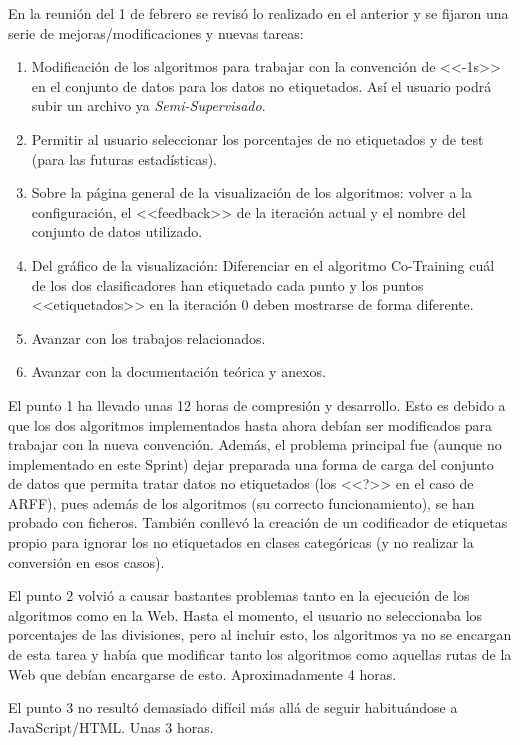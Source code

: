 En la reunión del 1 de febrero se revisó lo realizado en el anterior y se fijaron
una serie de mejoras/modificaciones y nuevas tareas:
\begin{enumerate}
    \item Modificación de los algoritmos para trabajar con la convención de
    <<-1s>> en el conjunto de datos para los datos no etiquetados. Así el
    usuario podrá subir un archivo ya \textit{Semi-Supervisado}.
    \item Permitir al usuario seleccionar los porcentajes de no etiquetados y de
    test (para las futuras estadísticas).
    \item Sobre la página general de la visualización de los algoritmos: volver
    a la configuración, el <<feedback>> de la iteración actual y el nombre del
    conjunto de datos utilizado.
    \item Del gráfico de la visualización: Diferenciar en el algoritmo
    Co-Training cuál de los dos clasificadores han etiquetado cada punto y los
    puntos <<etiquetados>> en la iteración 0 deben mostrarse de forma diferente.
    \item Avanzar con los trabajos relacionados.
    \item Avanzar con la documentación teórica y anexos.
\end{enumerate}

El punto 1 ha llevado unas 12 horas de compresión y desarrollo. Esto es debido a
que los dos algoritmos implementados hasta ahora debían ser modificados para
trabajar con la nueva convención. Además, el problema principal fue (aunque no
implementado en este Sprint) dejar preparada una forma de carga del conjunto de
datos que permita tratar datos no etiquetados (los <<?>> en el caso de ARFF),
pues además de los algoritmos (su correcto funcionamiento), se han probado con
ficheros. También conllevó la creación de un codificador de etiquetas propio
para ignorar los no etiquetados en clases categóricas (y no realizar la
conversión en esos casos).

El punto 2 volvió a causar bastantes problemas tanto en la ejecución de los
algoritmos como en la Web. Hasta el momento, el usuario no seleccionaba los
porcentajes de las divisiones, pero al incluir esto, los algoritmos ya no se
encargan de esta tarea y había que modificar tanto los algoritmos como aquellas
rutas de la Web que debían encargarse de esto. Aproximadamente 4 horas.

El punto 3 no resultó demasiado difícil más allá de seguir habituándose a
JavaScript/HTML. Unas 3 horas.

